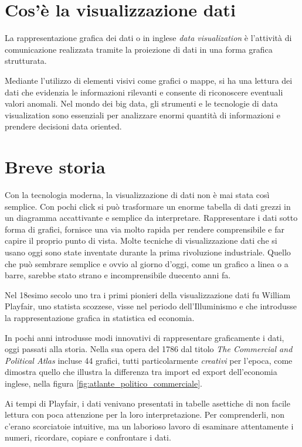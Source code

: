 
\section{Cos'è la visualizzazione dati}
La rappresentazione grafica dei dati o in inglese \emph{data visualization} è l’attività di comunicazione realizzata tramite la proiezione di dati in una forma grafica strutturata.

Mediante l’utilizzo di elementi visivi come grafici o mappe, si ha una lettura dei dati che evidenzia le informazioni rilevanti e consente di riconoscere eventuali valori anomali.
Nel mondo dei big data, gli strumenti e le tecnologie di data visualization sono essenziali per analizzare enormi quantità di informazioni e prendere decisioni data oriented.

\section{Breve storia}

Con la tecnologia moderna, la visualizzazione di dati non è mai stata così semplice.
Con pochi click si può trasformare un enorme tabella di dati grezzi in un diagramma accattivante e semplice da interpretare.
Rappresentare i dati sotto forma di grafici, fornisce una via molto rapida per rendere comprensibile e far capire il proprio punto di vista.
Molte tecniche di visualizzazione dati che si usano oggi sono state inventate durante la prima rivoluzione industriale.
Quello che può sembrare semplice e ovvio al giorno d’oggi, come un grafico a linea o a barre, sarebbe stato strano e incomprensibile duecento anni fa.

Nel 18esimo secolo uno tra i primi pionieri della visualizzazione dati fu William Playfair, uno statista scozzese, visse nel periodo dell’Illuminismo e che introdusse la rappresentazione grafica in statistica ed economia.

In pochi anni introdusse modi innovativi di rappresentare graficamente i dati, oggi passati alla storia. Nella sua opera del 1786 dal titolo \emph{The Commercial and Political Atlas} incluse 44 grafici, tutti particolarmente \emph{creativi} per l’epoca, come dimostra quello che illustra la differenza tra import ed export dell’economia inglese, nella figura \ref{fig:atlante_politico_commerciale}.

Ai tempi di Playfair, i dati venivano presentati in tabelle asettiche di non facile lettura con poca attenzione per la loro interpretazione. Per comprenderli, non c’erano scorciatoie intuitive, ma un laborioso lavoro di esaminare attentamente i numeri, ricordare, copiare e confrontare i dati.

